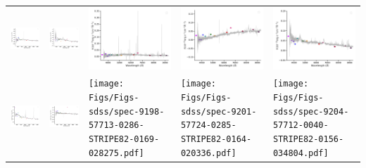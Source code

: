 \begin{center}
\begin{longtable}{l l l l l }
    \includegraphics[width=0.19\linewidth, clip]{Figs/Figs-sdss/spec-9163-58043-0013-STRIPE82-0122-036068.pdf} & \includegraphics[width=0.19\linewidth, clip]{Figs/Figs-sdss/spec-9163-58043-0440-STRIPE82-0120-045064.pdf} & \includegraphics[width=0.19\linewidth, clip]{Figs/Figs-sdss/spec-9166-58051-0118-STRIPE82-0132-037548.pdf} & \includegraphics[width=0.19\linewidth, clip]{Figs/Figs-sdss/spec-9168-58067-0396-STRIPE82-0136-026983.pdf} & \includegraphics[width=0.19\linewidth, clip]{Figs/Figs-sdss/spec-9172-58015-0449-STRIPE82-0148-018355.pdf} \\
    \includegraphics[width=0.19\linewidth, clip]{Figs/Figs-sdss/spec-9180-57693-0793-STRIPE82-0120-000615.pdf} & \includegraphics[width=0.19\linewidth, clip]{Figs/Figs-sdss/spec-9180-57693-0928-STRIPE82-0121-040706.pdf} & \texttt{[image: Figs/Figs-sdss/spec-9198-57713-0286-STRIPE82-0169-028275.pdf]} & \texttt{[image: Figs/Figs-sdss/spec-9201-57724-0285-STRIPE82-0164-020336.pdf]} & \texttt{[image: Figs/Figs-sdss/spec-9204-57712-0040-STRIPE82-0156-034804.pdf]} \\

\end{longtable}
\end{center}
